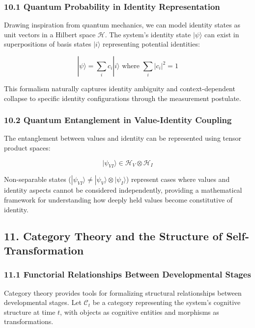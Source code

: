 \documentclass[
]{article}
\begin{document}
\subsubsection{10.1 Quantum Probability in Identity
Representation}\label{quantum-probability-in-identity-representation}

Drawing inspiration from quantum mechanics, we can model identity states
as unit vectors in a Hilbert space \(\mathcal{H}\). The system's
identity state \(|\psi\rangle\) can exist in superpositions of basis
states \(|i\rangle\) representing potential identities:

\[|\psi\rangle = \sum_i c_i |i\rangle \text{ where } \sum_i |c_i|^2 = 1\]

This formalism naturally captures identity ambiguity and
context-dependent collapse to specific identity configurations through
the measurement postulate.

\subsubsection{10.2 Quantum Entanglement in Value-Identity
Coupling}\label{quantum-entanglement-in-value-identity-coupling}

The entanglement between values and identity can be represented using
tensor product spaces:

\[|\psi_{VI}\rangle \in \mathcal{H}_V \otimes \mathcal{H}_I\]

Non-separable states
(\(|\psi_{VI}\rangle \neq |\psi_V\rangle \otimes |\psi_I\rangle\))
represent cases where values and identity aspects cannot be considered
independently, providing a mathematical framework for understanding how
deeply held values become constitutive of identity.

\subsection{11. Category Theory and the Structure of
Self-Transformation}\label{category-theory-and-the-structure-of-self-transformation}

\subsubsection{11.1 Functorial Relationships Between Developmental
Stages}\label{functorial-relationships-between-developmental-stages}

Category theory provides tools for formalizing structural relationships
between developmental stages. Let \(\mathcal{C}_t\) be a category
representing the system's cognitive structure at time \(t\), with
objects as cognitive entities and morphisms as transformations.
\end{document}
